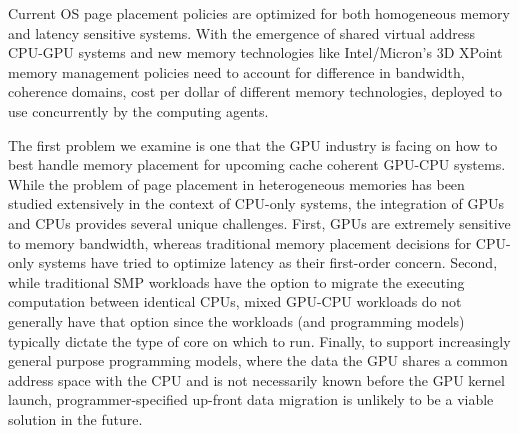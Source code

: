 Current OS page placement policies are optimized for both homogeneous memory and
latency sensitive systems. With the emergence of shared virtual address CPU-GPU
systems and new memory technologies like Intel/Micron's 3D XPoint memory management
policies need to account for difference in bandwidth, coherence domains, cost
per dollar of different memory technologies, deployed to use concurrently by the
computing agents.

The first problem we examine is one that the GPU industry is
facing on how to best handle memory placement for upcoming cache coherent
GPU-CPU systems.  While the problem of page placement in heterogeneous memories
has been studied extensively in the context of CPU-only systems, the
integration of GPUs and CPUs provides several unique challenges.  First, GPUs
are extremely sensitive to memory bandwidth, whereas traditional memory
placement decisions for CPU-only systems have tried to optimize latency as their
first-order concern.  Second, while traditional SMP workloads have the option to
migrate the executing computation between identical CPUs, mixed GPU-CPU
workloads do not generally have that option since the workloads (and programming
models) typically dictate the type of core on which to run.  
Finally, to support increasingly general purpose programming models, where the
data the GPU shares a common address space with the CPU and is not necessarily
known before the GPU kernel launch, programmer-specified up-front data migration
is unlikely to be a viable solution in the future.

